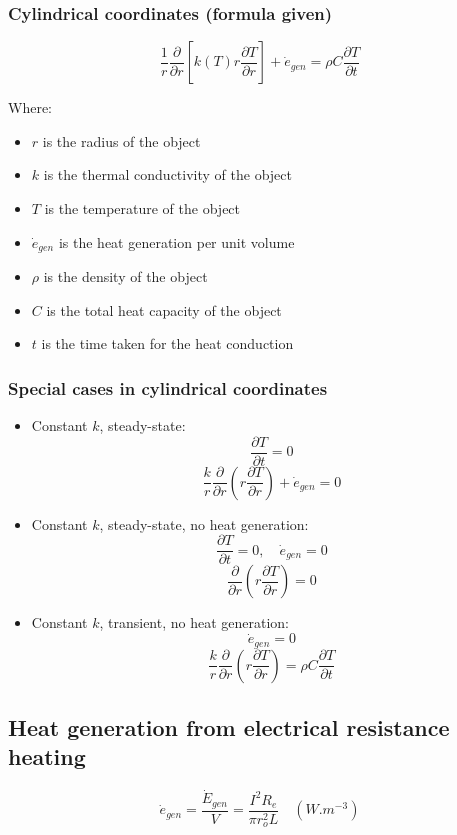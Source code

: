\documentclass[11pt]{article}
\begin{document}
\subsubsection{Cylindrical coordinates (formula given)}
\label{sec:org02f3d21}
\[\frac{1}{r} \frac{\partial}{\partial r} \left[k(T) r \frac{\partial T}{\partial r} \right] + \dot{e}_{gen} = \rho C \frac{\partial T}{\partial t}\]

Where:
\begin{itemize}
\item \(r\) is the radius of the object
\item \(k\) is the thermal conductivity of the object
\item \(T\) is the temperature of the object
\item \(\dot{e}_{gen}\) is the heat generation per unit volume
\item \(\rho\) is the density of the object
\item \(C\) is the total heat capacity of the object
\item \(t\) is the time taken for the heat conduction
\end{itemize}
\subsubsection{Special cases in cylindrical coordinates}
\label{sec:org7bddf21}
\begin{itemize}
\item Constant \(k\), steady-state:
\[\frac{\partial T}{\partial t} = 0\]
\[\frac{k}{r} \frac{\partial}{\partial r} \left(r \frac{\partial T}{\partial r} \right) + \dot{e}_{gen} = 0\]
\item Constant \(k\), steady-state, no heat generation:
\[\frac{\partial T}{\partial t} = 0, \quad \dot{e}_{gen} = 0\]
\[\frac{\partial}{\partial r} \left(r \frac{\partial T}{\partial r} \right) = 0\]
\item Constant \(k\), transient, no heat generation:
\[\dot{e}_{gen} = 0\]
\[\frac{k}{r} \frac{\partial}{\partial r} \left(r \frac{\partial T}{\partial r} \right) = \rho C \frac{\partial T}{\partial t}\]
\end{itemize}
\subsection{Heat generation from electrical resistance heating}
\label{sec:org050f7b2}
\[\dot{e}_{gen} = \frac{\dot{E}_{gen}}{V} = \frac{I^2 R_e}{\pi r_o^2 L} \quad (\unit{W.m^{-3}})\]
\end{document}
